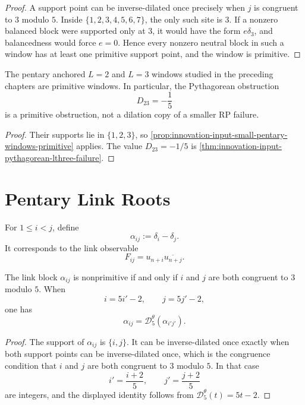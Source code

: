 \begin{proof}
A support point can be inverse-dilated once precisely when $j$ is
congruent to $3$ modulo $5$.
Inside $\{1,2,3,4,5,6,7\}$, the only such site is $3$. If a nonzero
balanced block were supported only at $3$, it would have the form
$e\delta_3$, and balancedness would force $e=0$. Hence every nonzero
neutral block in such a window has at least one primitive support point,
and the window is primitive.
\end{proof}

\begin{corollary}
\label{cor:innovation-input-early-pentary-failures-primitive}
The pentary anchored $L=2$ and $L=3$ windows studied in the preceding
chapters are primitive windows. In particular, the Pythagorean obstruction
$$
D_{23}=-\frac15
$$
is a primitive obstruction, not a dilation copy of a smaller RP failure.
\end{corollary}

\begin{proof}
Their supports lie in $\{1,2,3\}$, so
\autoref{prop:innovation-input-small-pentary-windows-primitive} applies.
The value $D_{23}=-1/5$ is
\autoref{thm:innovation-input-pythagorean-lthree-failure}.
\end{proof}

\section{Pentary Link Roots}
\label{sec:innovation-input-pentary-link-roots}

\begin{definition}
\label{def:innovation-input-link-block}
For $1\le i<j$, define
$$
\alpha_{ij}:=\delta_i-\delta_j.
$$
It corresponds to the link observable
$$
F_{ij}=u_{n+i}\overline{u_{n+j}}.
$$
\end{definition}

\begin{proposition}
\label{prop:innovation-input-pentary-link-primitive-criterion}
The link block $\alpha_{ij}$ is nonprimitive if and only if
$i$ and $j$ are both congruent to $3$ modulo $5$.
When
$$
i=5i'-2,
\qquad
j=5j'-2,
$$
one has
$$
\alpha_{ij}
=
\mathcal D_5^\theta(\alpha_{i'j'}).
$$
\end{proposition}

\begin{proof}
The support of $\alpha_{ij}$ is $\{i,j\}$. It can be inverse-dilated once
exactly when both support points can be inverse-dilated once, which is the
congruence condition that $i$ and $j$ are both congruent to $3$ modulo
$5$. In that case
$$
i'=\frac{i+2}{5},
\qquad
j'=\frac{j+2}{5}
$$
are integers, and the displayed identity follows from
$\mathcal D_5^\theta(t)=5t-2$.
\end{proof}

